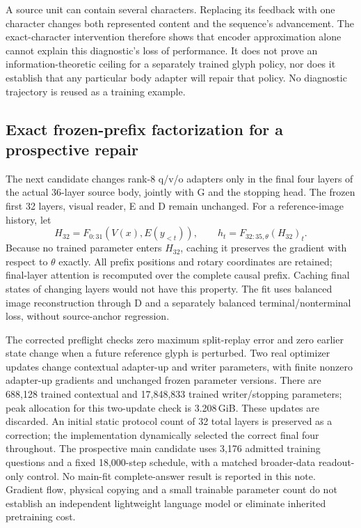 \documentclass[10pt,a4paper]{article}
\providecommand{\DIFadd}[1]{{\protect\color{blue} \sf #1}} %
\begin{document}
\DIFadd{A source unit can contain several characters. Replacing its feedback with
one character changes both represented content and the sequence's advancement.
The exact-character intervention therefore shows that encoder approximation
alone cannot explain this diagnostic's loss of performance. It does not prove
an information-theoretic ceiling for a separately trained glyph policy, nor
does it establish that any particular body adapter will repair that policy.
No diagnostic trajectory is reused as a training example.
}

\subsection*{\DIFadd{Exact frozen-prefix factorization for a prospective repair}}
\DIFadd{The next candidate changes rank-8 q/v/o adapters only in the final four layers
of the actual 36-layer source body, jointly with G and the stopping head.
The frozen first 32 layers, visual reader, E and D remain unchanged. For a
reference-image history, let
}\[
 H_{32}=F_{0:31}(V(x),E(y_{<t})),\qquad
 h_t=F_{32:35,\theta}(H_{32})_t.
\]
\DIFadd{Because no trained parameter enters $H_{32}$, caching it preserves the gradient
with respect to $\theta$ exactly. All prefix positions and rotary coordinates
are retained; final-layer attention is recomputed over the complete causal
prefix. Caching final states of changing layers would not have this property.
The fit uses balanced image reconstruction through D and a separately balanced
terminal/nonterminal loss, without source-anchor regression.
}

\DIFadd{The corrected preflight checks zero maximum split-replay error and zero earlier
state change when a future reference glyph is perturbed. Two real optimizer
updates change contextual adapter-up and writer parameters, with finite nonzero
adapter-up gradients and unchanged frozen parameter versions. There are 688,128
trained contextual and 17,848,833 trained writer/stopping parameters; peak
allocation for this two-update check is 3.208\,GiB. These updates are discarded.
An initial static protocol count of 32 total layers is preserved as a correction;
the implementation dynamically selected the correct final four throughout.
The prospective main candidate uses 3,176 admitted training questions and a
fixed 18,000-step schedule, with a matched broader-data readout-only control.
No main-fit complete-answer result is reported in this note. Gradient flow,
physical copying and a small trainable parameter count do not establish an
independent lightweight language model or eliminate inherited pretraining cost.
}
\end{document}
